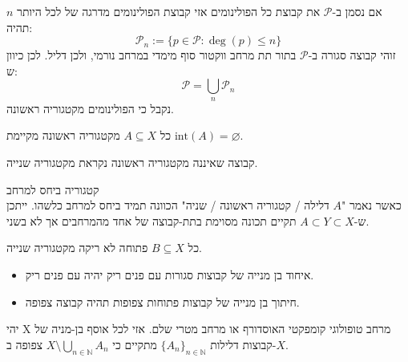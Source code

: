\documentclass{tstextbook}
\begin{document}
\begin{example}[הפולינומים]
אם נסמן ב-\(\mathcal{P}\) את קבוצת כל הפולינומים אזי קבוצת הפולינומים מדרגה של לכל היותר \(n\) תהיה:
$${\mathcal{P}}_{n}:=\{p\in{\mathcal{P}}:\deg(p)\leq n\}$$
זוהי קבוצה סגורה ב-\(\mathcal{P}\) בתור תת מרחב ווקטור סוף מימדי במרחב נורמי, ולכן דליל. לכן כיוון ש:
$$\mathcal{P}=\bigcup_{n}\mathcal{P} _{n} $$
נקבל כי הפולינומים מקטגוריה ראשונה.

\end{example}
\begin{proposition}
כל \(A\subseteq X\) מקטגוריה ראשונה מקיימת \(\text{int}(A)=\varnothing\).

\end{proposition}
\begin{definition}
קבוצה שאיננה מקטגוריה ראשונה נקראת מקטגוריה שנייה.

\end{definition}
\begin{remark}
קטגוריה ביחס למרחב\\

כאשר נאמר "\(A\) דלילה / קטגוריה ראשונה / שניה" הכוונה תמיד ביחס למרחב כלשהו. 
ייתכן ש-\(A\subset Y\subset X\) תקיים תכונה מסוימת בתת-קבוצה של אחד מהמרחבים אך לא בשני.

\end{remark}
\begin{proposition}
כל \(B\subseteq X\) פתוחה לא ריקה מקטגוריה שנייה.

\end{proposition}
\begin{lemma}
  \begin{itemize}
    \item איחוד בן מנייה של קבוצות סגורות עם פנים ריק יהיה עם פנים ריק.
    \item חיתוך בן מנייה של קבוצות פתוחות צפופות תהיה קבוצה צפופה.
  \end{itemize}
\end{lemma}
\begin{theorem}
יהי X מרחב טופולוגי קומפקטי האוסדורף או מרחב מטרי שלם.
אזי לכל אוסף בן-מניה של קבוצות דלילות \(\{A_{n}\}_{n\in\mathbb{N}}\) מתקיים כי \(X\setminus\bigcup_{n\in\mathbb{N}}A_{n}\) צפופה ב-\(X\).

\end{theorem}
\end{document}
